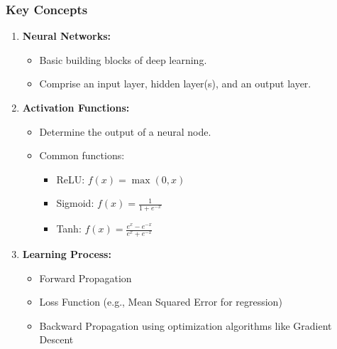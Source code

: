 \documentclass[aspectratio=169]{beamer}
\begin{document}
\begin{frame}[fragile]
    \frametitle{Key Concepts}
    \begin{enumerate}
        \item \textbf{Neural Networks:}
            \begin{itemize}
                \item Basic building blocks of deep learning.
                \item Comprise an input layer, hidden layer(s), and an output layer.
            \end{itemize}
        \item \textbf{Activation Functions:}
            \begin{itemize}
                \item Determine the output of a neural node.
                \item Common functions:
                    \begin{itemize}
                        \item ReLU: $f(x) = \max(0, x)$
                        \item Sigmoid: $f(x) = \frac{1}{1 + e^{-x}}$
                        \item Tanh: $f(x) = \frac{e^{x} - e^{-x}}{e^{x} + e^{-x}}$
                    \end{itemize}
            \end{itemize}
        \item \textbf{Learning Process:}
            \begin{itemize}
                \item Forward Propagation
                \item Loss Function (e.g., Mean Squared Error for regression)
                \item Backward Propagation using optimization algorithms like Gradient Descent
            \end{itemize}
    \end{enumerate}
\end{frame}
\end{document}
